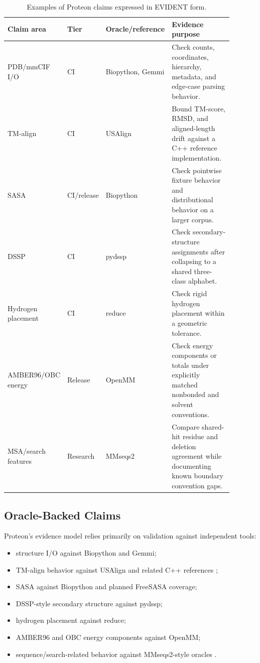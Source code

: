 \documentclass[10pt,twoside]{article}
\begin{document}
\begin{table}[h]
\centering
\caption{Examples of Proteon claims expressed in EVIDENT form.}
\small
\begin{tabular}{p{0.22\linewidth}p{0.13\linewidth}p{0.18\linewidth}p{0.36\linewidth}}
\toprule
Claim area & Tier & Oracle/reference & Evidence purpose \\
\midrule
PDB/mmCIF I/O & CI & Biopython, Gemmi & Check counts, coordinates,
hierarchy, metadata, and edge-case parsing behavior. \\
TM-align & CI & USAlign & Bound TM-score, RMSD, and aligned-length drift
against a C++ reference implementation. \\
SASA & CI/release & Biopython & Check pointwise fixture behavior and
distributional behavior on a larger corpus. \\
DSSP & CI & pydssp & Check secondary-structure assignments after
collapsing to a shared three-class alphabet. \\
Hydrogen placement & CI & reduce & Check rigid hydrogen placement within a
geometric tolerance. \\
AMBER96/OBC energy & Release & OpenMM & Check energy components or totals
under explicitly matched nonbonded and solvent conventions. \\
MSA/search features & Research & MMseqs2 & Compare shared-hit residue and
deletion agreement while documenting known boundary convention gaps. \\
\bottomrule
\end{tabular}
\end{table}

\subsection{Oracle-Backed Claims}

Proteon's evidence model relies primarily on validation against independent
tools:

\begin{itemize}[leftmargin=*]
  \item structure I/O against Biopython and Gemmi;
  \item TM-align behavior against USAlign and related C++ references
        \citep{zhang2005tmalign};
  \item SASA against Biopython and planned FreeSASA coverage;
  \item DSSP-style secondary structure against pydssp;
  \item hydrogen placement against reduce;
  \item AMBER96 and OBC energy components against OpenMM;
  \item sequence/search-related behavior against MMseqs2-style oracles
        \citep{soeding2005protein}.
\end{itemize}
\end{document}
